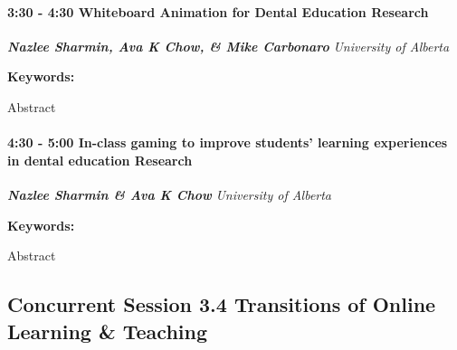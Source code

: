 \documentclass[
]{book}
\begin{document}
\begin{session}
\hypertarget{whiteboard-animation-for-dental-education-research}{%
\paragraph*{\texorpdfstring{3:30 - 4:30 \textbar{} \textbf{Whiteboard
Animation for Dental Education} \textbar{}
Research}{3:30 - 4:30 \textbar{} Whiteboard Animation for Dental Education \textbar{} Research}}\label{whiteboard-animation-for-dental-education-research}}

\textbf{\emph{Nazlee Sharmin, Ava K Chow, \& Mike Carbonaro}} \textbar{}
\emph{University of Alberta}

\textbf{Keywords:}

Abstract
\end{session}
\begin{session}
\hypertarget{in-class-gaming-to-improve-students-learning-experiences-in-dental-education-research}{%
\paragraph*{\texorpdfstring{4:30 - 5:00 \textbar{} \textbf{In-class
gaming to improve students' learning experiences in dental education}
\textbar{}
Research}{4:30 - 5:00 \textbar{} In-class gaming to improve students' learning experiences in dental education \textbar{} Research}}\label{in-class-gaming-to-improve-students-learning-experiences-in-dental-education-research}}

\textbf{\emph{Nazlee Sharmin \& Ava K Chow}} \textbar{} \emph{University
of Alberta}

\textbf{Keywords:}

Abstract
\end{session}

\hypertarget{concurrent-session-3.4-transitions-of-online-learning-teaching}{%
\subsection*{Concurrent Session 3.4 \textbar{} Transitions of Online Learning \& Teaching}\label{concurrent-session-3.4-transitions-of-online-learning-teaching}}
\end{document}
